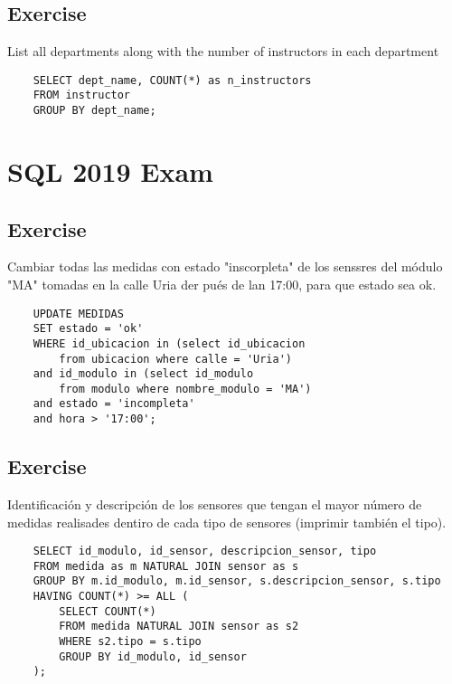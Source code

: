 \documentclass{article}
\begin{document}
\vspace{4mm}
\subsection{Exercise}
\noindent List all departments along with the number of instructors in each
department
\begin{lstlisting}
    SELECT dept_name, COUNT(*) as n_instructors
    FROM instructor
    GROUP BY dept_name;
\end{lstlisting}

\newpage
\section{SQL 2019 Exam}
\subsection{Exercise}
\noindent Cambiar todas las medidas con estado "inscorpleta" de los senssres del
módulo "MA" tomadas en la calle Uria der pués de lan 17:00, para que estado sea ok.
\begin{lstlisting}
    UPDATE MEDIDAS
    SET estado = 'ok'
    WHERE id_ubicacion in (select id_ubicacion
        from ubicacion where calle = 'Uria')
    and id_modulo in (select id_modulo
        from modulo where nombre_modulo = 'MA')
    and estado = 'incompleta'
    and hora > '17:00';
\end{lstlisting}

\vspace{4mm}
\subsection{Exercise}
\noindent Identificación y descripción de los sensores que tengan el mayor número de
medidas realisades dentiro de cada tipo de sensores (imprimir también el tipo).
\begin{lstlisting}
    SELECT id_modulo, id_sensor, descripcion_sensor, tipo
    FROM medida as m NATURAL JOIN sensor as s
    GROUP BY m.id_modulo, m.id_sensor, s.descripcion_sensor, s.tipo
    HAVING COUNT(*) >= ALL (
        SELECT COUNT(*)
        FROM medida NATURAL JOIN sensor as s2
        WHERE s2.tipo = s.tipo
        GROUP BY id_modulo, id_sensor
    );
\end{lstlisting}

\vspace{4mm}
\end{document}
